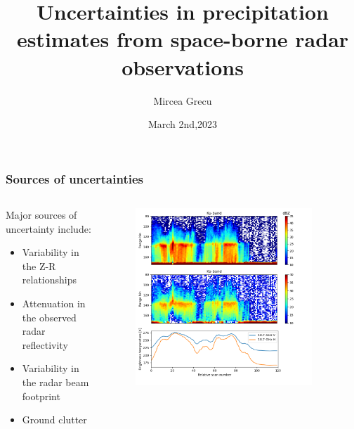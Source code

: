 \documentclass{beamer}
\title{Uncertainties in precipitation
estimates from space-borne radar observations}
\author{Mircea Grecu}
\institute{NASA Goddard Space Flight Center and Morgan State University}
\date{March 2nd,2023}
\begin{document}
\frame{\titlepage}
\begin{frame}
\frametitle{Sources of uncertainties}
\begin{columns}
\begin{column}{0.45\textwidth}
    Major sources of uncertainty include:
    \begin{itemize}
        \item Variability in the Z-R relationships
        \item Attenuation in the observed radar reflectivity
        \item Variability in the radar beam footprint
        \item Ground clutter
    \end{itemize}
\end{column}
\begin{column}{0.55\textwidth}  %
    \begin{figure}
    \begin{center}
     \includegraphics[width=0.9\textwidth]{Figures/fig1.png}
     \end{center}
    \end{figure}
\end{column}
\end{columns}
\end{frame}
\end{document}
